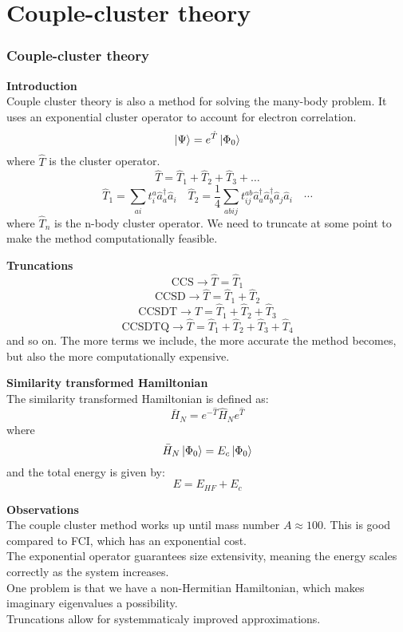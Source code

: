 \documentclass[UKenglish,aspectratio=169,12pt]{beamer}
\begin{document}
\section{Couple-cluster theory}

\begin{frame}
    \frametitle{Couple-cluster theory}
    \textbf{Introduction}\\
    Couple cluster theory is also a method for solving the many-body problem. It uses an exponential cluster operator to account for electron correlation. 
    \[
    \ket{\Psi} = e^{\hat{T}}\ket{\Phi_0}
    \]
    where $\hat{T}$ is the cluster operator.
    \[
    \hat{T} = \hat{T}_1 + \hat{T}_2 + \hat{T}_3 + \dots
    \]
    \[
    \hat{T}_1 = \sum_{ai} t_{i}^{a} \hat{a}^{\dagger}_a \hat{a}_i \quad \hat{T}_2 =  \frac{1}{4} \sum_{abij} t_{ij}^{ab} \hat{a}^{\dagger}_a \hat{a}^{\dagger}_b \hat{a}_j \hat{a}_i \quad \cdots   
    \]
    where $\hat{T}_n$ is the n-body cluster operator. We need to truncate at some point to make the method computationally feasible.
\end{frame}

\begin{frame}
    \textbf{Truncations}\\
    \[
    \text{CCS} \rightarrow \hat{T} = \hat{T}_1
    \]
    \[
    \text{CCSD} \rightarrow \hat{T} = \hat{T}_1 + \hat{T}_2
    \]
    \[
    \text{CCSDT} \rightarrow \hat{T} = \hat{T}_1 + \hat{T}_2 + \hat{T}_3
    \]
    \[
    \text{CCSDTQ} \rightarrow \hat{T} = \hat{T}_1 + \hat{T}_2 + \hat{T}_3 + \hat{T}_4
    \]
    and so on. The more terms we include, the more accurate the method becomes, but also the more computationally expensive.
\end{frame}
\begin{frame}
    \textbf{Similarity transformed Hamiltonian}\\
    The similarity transformed Hamiltonian is defined as:
    \[
    \bar{H}_N = e^{-\hat{T}}\hat{H}_Ne^{\hat{T}}
    \]
    where 
    \[
    \bar{H}_N \ket{\Phi_0} = E_c \ket{\Phi_0}
    \]
    and the total energy is given by:
    \[
    E = E_{HF} + E_c
    \]
\end{frame}


\begin{frame}
    \textbf{Observations}\\
    The couple cluster method works up until mass number $A \approx 100$. This is good compared to FCI, which has an exponential cost. \\
    The exponential operator guarantees size extensivity, meaning the energy scales correctly as the system increases.\\
    One problem is that we have a non-Hermitian Hamiltonian, which makes imaginary eigenvalues a possibility.\\
    Truncations allow for systemmaticaly improved approximations.

\end{frame}
\end{document}

